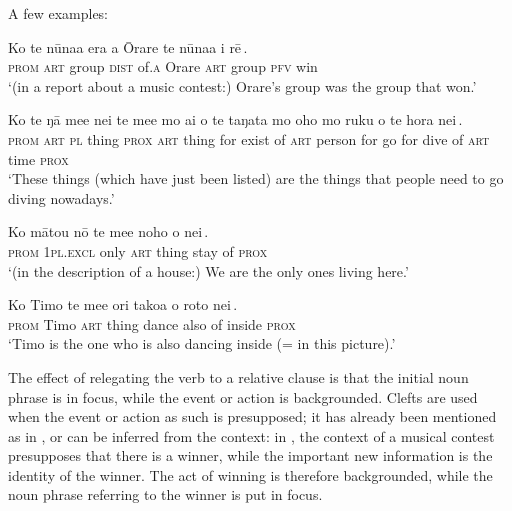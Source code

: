 A few examples:

\ea\label{ex:9.40}
\gll Ko te nūna{\ꞌ}a era {\ꞌ}a {\ꞌ}Ōrare {\ob}te nūna{\ꞌ}a i rē\,{\cb}. \\
\textsc{prom} \textsc{art} group \textsc{dist} of\textsc{.a} Orare {\db}\textsc{art} group \textsc{pfv} win \\

\glt 
‘(in a report about a music contest:) Orare’s group was the group that won.’ \textstyleExampleref{[R539-3.313]}
\z

\ea\label{ex:9.41}
\gll Ko te ŋā me{\ꞌ}e nei {\ob}te me{\ꞌ}e mo ai o te taŋata  mo oho mo ruku o te hora nei\,{\cb}.\\
\textsc{prom} \textsc{art} \textsc{pl} thing \textsc{prox} {\db}\textsc{art} thing for exist of \textsc{art} person  for go for dive of \textsc{art} time \textsc{prox}\\

\glt 
‘These things (which have just been listed) are the things that people need to go diving nowadays.’ \textstyleExampleref{[R360.002]} 
\z

\ea\label{ex:9.42}
\gll Ko mātou nō {\ob}te me{\ꞌ}e noho o nei\,{\cb}. \\
\textsc{prom} \textsc{1pl.excl} only {\db}\textsc{art} thing stay of \textsc{prox} \\

\glt 
‘(in the description of a house:) We are the only ones living here.’ \textstyleExampleref{[R404.050]} 
\z

\ea\label{ex:9.43}
\gll Ko Timo {\ob}te me{\ꞌ}e {\ꞌ}ori tako{\ꞌ}a o roto nei\,{\cb}. \\
\textsc{prom} Timo {\db}\textsc{art} thing dance also of inside \textsc{prox} \\

\glt
‘Timo is the one who is also dancing inside (= in this picture).’ \textstyleExampleref{[R414.129]} 
\z

The effect of relegating the verb to a relative clause is that the initial noun phrase is in focus, while the event or action is backgrounded. Clefts are used when the event or action as such is presupposed; it has already been mentioned as in , or can be inferred from the context: in , the context of a musical contest presupposes that there is a winner, while the important new information is the identity of the winner. The act of winning is therefore backgrounded, while the noun phrase referring to the winner is put in focus.

